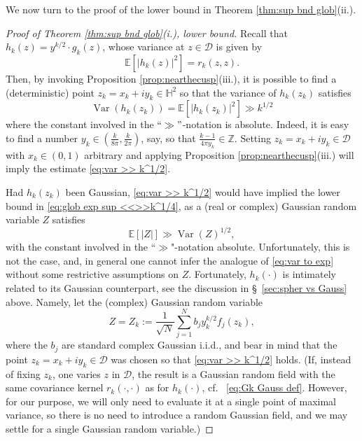 \documentclass[12pt, a4paper]{amsart}
\theoremstyle{definition}
\newcommand {\Z} {\mathbb{Z}}
\newcommand {\E} {\mathbb{E}}
\newcommand {\1} {\mathbf{1}}
\newcommand {\Hb} {\mathbb {H}}
\newcommand {\Dc} {\mathcal{D}}
\newcommand{\var}{\operatorname{Var}}
\numberwithin{equation}{section}
\begin{document}
We now turn to the proof of the lower bound in Theorem \ref{thm:sup bnd glob}(ii.).
\begin{proof}[Proof of Theorem \ref{thm:sup bnd glob}(i.), lower bound]

Recall that $h_{k}(z) = y^{k/2}\cdot g_{k}(z)$, whose variance at $z\in\Dc$ is given by
\begin{equation*}
\E\left[ \left| h_{k}(z)  \right|^{2}  \right] = r_{k}(z,z).
\end{equation*}
Then, by invoking Proposition \ref{prop:nearthecusp}(iii.), it is possible to find a (deterministic) point $z_{k}=x_{k}+iy_{k}\in \Hb^{2}$ so that the variance of $h_{k}(z_{k})$ satisfies
\begin{equation}
\label{eq:var >> k^1/2}
\var(h_{k}(z_{k})) = \E\left[ \left| h_{k}(z_{k})  \right|^{2}  \right]  \gg k^{1/2}
\end{equation}
where the constant involved in the $``\gg"$-notation is absolute.
Indeed, it is easy to find a number $y_{k}\in \left( \frac{k}{8\pi}  ,\frac{k}{2\pi}\right)$, say, so that $\frac{k-1}{4\pi y_{k}}\in \Z$. Setting $z_{k}=x_{k}+iy_{k}\in\Dc$ with $x_{k}\in (0,1)$ arbitrary
and applying Proposition \ref{prop:nearthecusp}(iii.) will imply the estimate \eqref{eq:var >> k^1/2}.


Had $h_{k}(z_{k})$ been Gaussian, \eqref{eq:var >> k^1/2} would have implied the lower bound in \eqref{eq:glob exp sup <<>>k^1/4}, as a (real or complex) Gaussian random variable $Z$ satisfies
\begin{equation}
\label{eq:var to exp}
\E\left[|Z| \right] \gg \var(Z)^{1/2},
\end{equation}
with the constant involved in the ``$\gg$"-notation absolute. Unfortunately, this is not the case, and, in general one cannot infer the
analogue of \eqref{eq:var to exp} without some restrictive assumptions on $Z$. Fortunately, $h_{k}(\cdot)$ is intimately related to its Gaussian counterpart, see the discussion in \S~\ref{sec:spher vs Gauss} above.
Namely, let the (complex) Gaussian random variable
\begin{equation}
\label{eq:Z Gauss def}
Z = Z_{k}:= \frac{1}{\sqrt{N}}\sum\limits_{j=1}^{N}b_{j}y_{k}^{k/2}f_{j}(z_{k}),
\end{equation}
where the $b_{j}$ are standard complex Gaussian i.i.d., and bear in mind that the point $z_{k}=x_{k}+iy_{k}\in \Dc$ was chosen so that \eqref{eq:var >> k^1/2} holds.
(If, instead of fixing $z_{k}$, one varies $z$ in $\Dc$, the result is a Gaussian random field with the same covariance kernel $r_{k}(\cdot,\cdot)$ as for $h_{k}(\cdot)$, cf. ~\eqref{eq:Gk Gauss def}. 
However, for
our purpose, we will only need to evaluate it at a single point of maximal variance, so there is no need to introduce a random Gaussian field, and we may settle for a single Gaussian random variable.)



\end{proof}
\end{document}
